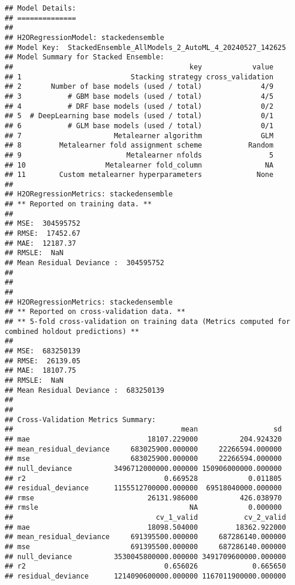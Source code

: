 \documentclass[
]{article}
\begin{document}
\begin{verbatim}
## Model Details:
## ==============
## 
## H2ORegressionModel: stackedensemble
## Model Key:  StackedEnsemble_AllModels_2_AutoML_4_20240527_142625 
## Model Summary for Stacked Ensemble: 
##                                          key            value
## 1                          Stacking strategy cross_validation
## 2       Number of base models (used / total)              4/9
## 3           # GBM base models (used / total)              4/5
## 4           # DRF base models (used / total)              0/2
## 5  # DeepLearning base models (used / total)              0/1
## 6           # GLM base models (used / total)              0/1
## 7                      Metalearner algorithm              GLM
## 8         Metalearner fold assignment scheme           Random
## 9                         Metalearner nfolds                5
## 10                   Metalearner fold_column               NA
## 11        Custom metalearner hyperparameters             None
## 
## H2ORegressionMetrics: stackedensemble
## ** Reported on training data. **
## 
## MSE:  304595752
## RMSE:  17452.67
## MAE:  12187.37
## RMSLE:  NaN
## Mean Residual Deviance :  304595752
## 
## 
## 
## H2ORegressionMetrics: stackedensemble
## ** Reported on cross-validation data. **
## ** 5-fold cross-validation on training data (Metrics computed for combined holdout predictions) **
## 
## MSE:  683250139
## RMSE:  26139.05
## MAE:  18107.75
## RMSLE:  NaN
## Mean Residual Deviance :  683250139
## 
## 
## Cross-Validation Metrics Summary: 
##                                        mean                  sd
## mae                            18107.229000          204.924320
## mean_residual_deviance     683025900.000000     22266594.000000
## mse                        683025900.000000     22266594.000000
## null_deviance          3496712000000.000000 150906000000.000000
## r2                                 0.669528            0.011805
## residual_deviance      1155512700000.000000  69518040000.000000
## rmse                           26131.986000          426.038970
## rmsle                                    NA            0.000000
##                                  cv_1_valid           cv_2_valid
## mae                            18098.504000         18362.922000
## mean_residual_deviance     691395500.000000     687286140.000000
## mse                        691395500.000000     687286140.000000
## null_deviance          3530045800000.000000 3491709600000.000000
## r2                                 0.656026             0.665650
## residual_deviance      1214090600000.000000 1167011900000.000000

\end{verbatim}
\end{document}
